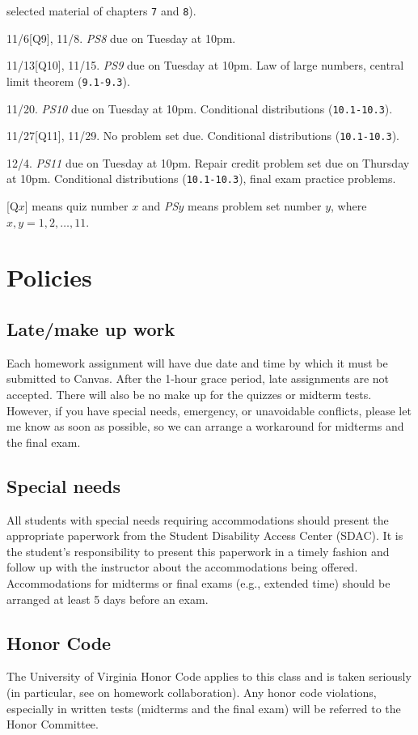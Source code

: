 \documentclass[oneside,11pt]{amsart}
\begin{document}
\begin{enumerate}[\bf{}{[}week 1{]}]
		selected material of chapters \texttt{7} and \texttt{8}).
	\item 11/6[Q9], 11/8.
		\emph{PS8} due on Tuesday at 10pm.
	\item 11/13[Q10], 11/15.
		\emph{PS9} due on Tuesday at 10pm.
		Law of large numbers, central limit theorem (\texttt{9.1-9.3}).
	\item 11/20.
		\emph{PS10} due on Tuesday at 10pm.
		Conditional distributions
		(\texttt{10.1-10.3}).
	\item 11/27[Q11], 11/29.
		No problem set due.
		Conditional distributions (\texttt{10.1-10.3}).
	\item 12/4.
		\emph{PS11} due on Tuesday at 10pm.
		Repair credit problem set due on Thursday at 10pm.
		Conditional distributions (\texttt{10.1-10.3}),
		final exam practice problems.
\end{enumerate}

\bigskip

[Q$x$] means quiz number $x$ and \emph{PS$y$} means problem set number $y$, where $x,y=1,2,\dots,11$.

\section{Policies}

\subsection{Late/make up work} Each homework
assignment will have due date and time by which it must be submitted to Canvas.
After the 1-hour grace period, late assignments are not accepted.
There will also be no make up for the quizzes or midterm tests.
However, if you have special needs, emergency, or unavoidable conflicts, please
let me know as soon as possible, so we can arrange a workaround for midterms and the final exam.

\subsection{Special needs}

All students with special needs requiring accommodations should present the
appropriate paperwork from the Student Disability Access Center (SDAC). It is
the student's responsibility to present this paperwork in a timely fashion and
follow up with the instructor about the accommodations being offered.
Accommodations for midterms or final exams (e.g., extended time) should be arranged at
least 5 days before an exam.

\subsection{Honor Code} The University of Virginia Honor Code applies to this
class and is taken seriously (in particular, 
see  on homework collaboration).
Any honor code violations,
especially in written tests (midterms and the final exam)
will be referred to the
Honor Committee.
\end{document}
